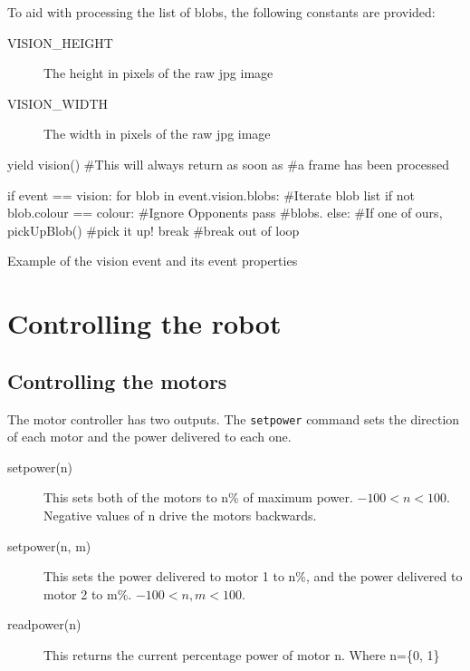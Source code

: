 \documentclass[a4paper, 12pt]{article}
\begin{document}
To aid with processing the list of blobs, the following constants are provided:
\begin{description}
\item[VISION\_HEIGHT] The height in pixels of the raw jpg image
\item[VISION\_WIDTH] The width in pixels of the raw jpg image
\end{description}

\begin{python}
\begin{verbatimtab}
yield vision()   #This will always return as soon as
                #a frame has been processed

if event == vision:
	for blob in event.vision.blobs: 	#Iterate blob list 
        	if not blob.colour == colour:  	#Ignore Opponents  
                	pass			#blobs.
		else:				#If one of ours,
			pickUpBlob()           	#pick it up!
			break			#break out of loop
\end{verbatimtab}
\caption{\label{py:vision}Example of the vision event and its event properties}
\end{python}


\section{Controlling the robot}
\subsection{Controlling the motors}
The motor controller has two outputs.  The \texttt{setpower} command
sets the direction of each motor and the power delivered to each one.

\begin{description}
\item[setpower(n)] This sets both of the motors to n\% of maximum
power.  $-100<n<100$. Negative values of n drive the motors backwards.
\item[setpower(n, m)] This sets the power delivered to motor 1 to n\%,
  and the power delivered to motor 2 to m\%. $-100<n,m<100$.
\item[readpower(n)] This returns the current percentage power of motor n. Where n=\{0, 1\} 
\end{description}

\vspace{12pt}

\end{document}
